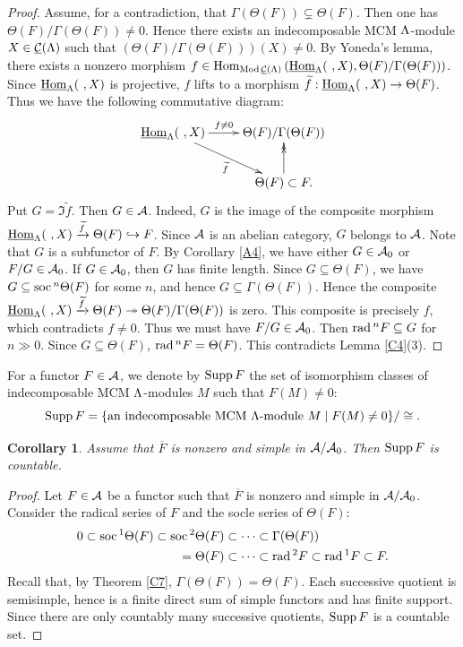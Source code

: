 \documentclass[11pt]{amsart}
\newtheorem{corollary}[theorem]{Corollary}
\theoremstyle{definition}
\numberwithin{equation}{section}
\begin{document}
\begin{proof}
Assume, for a contradiction, that $\Gamma(\Theta(F)) \subsetneq \Theta(F)$. 
Then one has  $\Theta(F)/\Gamma(\Theta(F))\neq 0$. 
Hence there exists an indecomposable MCM $\LL$-module $X\in \sCML$ such that $\left(\Theta(F)/\Gamma(\Theta(F))\right)(X)\neq 0$. 
By Yoneda's lemma, there exists a nonzero morphism $f\in \Hom_{\ModsCML} \left( \sHomL(\ , X), \Theta(F)/\Gamma(\Theta(F)) \right)$. 
Since $\sHomL(\ , X)$ is projective, $f$ lifts to a morphism $\widetilde f:\sHomL(\ , X)\to \Theta(F)$. 
Thus we have the following commutative diagram:
$$
\xymatrix{
\sHomL(\ , X) \ar[r]^-{f\neq 0} \ar[dr]_-{\widetilde f} &\Theta(F)/\Gamma(\Theta(F)) \\
&\Theta(F) \subset F . \ar@{->>}[u]}
$$
Put $G=\Im \widetilde f$. 
Then $G\in \AA$. 
Indeed, $G$ is the image of the composite morphism $\sHomL(\ , X) \xrightarrow{\widetilde f} \Theta(F) \hookrightarrow F$. 
Since $\AA$ is an abelian category, $G$ belongs to $\AA$.  
Note that $G$ is a subfunctor of $F$. 
By Corollary \ref{A4}, we have either $G\in \AA_0$ or $F/G\in \AA_0$. 
If $G \in \AA_0$, then $G$ has finite length. 
Since $G \subseteq \Theta (F)$, we have $G\subseteq \soc^n \Theta (F)$ for some $n$, and hence $G \subseteq \Gamma (\Theta (F))$.
Hence the composite $\sHomL(\ , X) \xrightarrow{\widetilde f} \Theta(F) \twoheadrightarrow \Theta(F)/\Gamma(\Theta(F))$ is zero. 
This composite is precisely $f$, which contradicts $f\neq 0$.
Thus we must have $F/G\in \AA_0$. 
Then $\rad ^n F \subseteq G$ for $n \gg 0$. 
Since $G \subseteq \Theta (F)$, $\rad ^n F = \Theta (F)$. 
This contradicts Lemma \ref{C4}(3). 
\end{proof}


For a functor $F \in \AA$, we denote by $\Supp F$ the set of isomorphism classes of indecomposable MCM $\LL$-modules $M$ such that $F(M) \not =0$: 
$$
\Supp F = \{ \text{an indecomposable MCM $\LL$-module $M$} \mid F(M) \not=0 \} /\cong . 
$$ 

\begin{corollary}\label{C8}
Assume that $\overline{F}$ is nonzero and simple in $\AA /  \AA_0$. 
Then $\Supp F$ is countable.  
\end{corollary}

\begin{proof}
Let $F \in \AA$ be a functor such that $\overline{F}$ is nonzero and simple in $\AA /  \AA_0$. 
Consider the radical series of $F$ and the socle series of $\Theta (F)$:
\begin{align*}
0 \subset \soc ^1 \Theta (F) \subset \soc ^2 \Theta (F) &\subset \cdots  \subset \Gamma (\Theta (F)) \\
=\Theta (F) &\subset \cdots \subset \rad ^2 F \subset \rad ^1 F \subset F. 
\end{align*}
Recall that, by Theorem \ref{C7}, $\Gamma (\Theta (F))=\Theta (F)$.  
Each successive quotient is semisimple, hence is a finite direct sum of simple functors and has finite support. 
Since there are only countably many successive quotients, $\Supp F$ is a countable set. 
\end{proof}
\end{document}
